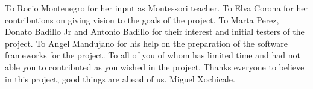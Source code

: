 \documentclass[sigconf]{acmart}
\begin{document}
\begin{acks}
To Rocio Montenegro for her input as Montessori teacher. To Elva Corona for her contributions on giving vision to the goals of the project. 
To Marta Perez, Donato Badillo Jr and Antonio Badillo for their interest and initial testers of the project. 
To Angel Mandujano for his help on the preparation of the software frameworks for the project. 
To all of you of whom has limited time and had not able you to contributed as you wished in the project.
Thanks everyone to believe in this project, good things are ahead of us. Miguel Xochicale.
\end{acks}

%
%
\printbibliography
\end{document}
